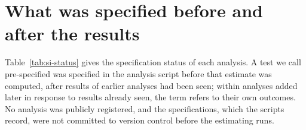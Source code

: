 \documentclass[11pt]{article}
\begin{document}
\section{What was specified before and after the results}\label{sec:si-prereg}

Table~\ref{tab:si-status} gives the specification status of each analysis. A test we call pre-specified was
specified in the analysis script before that estimate was computed, after results of earlier analyses had been seen;
within analyses added later in response to results already seen, the term refers to their own outcomes. No analysis
was publicly registered, and the specifications, which the scripts record, were not committed to version control
before the estimating runs.
\end{document}
